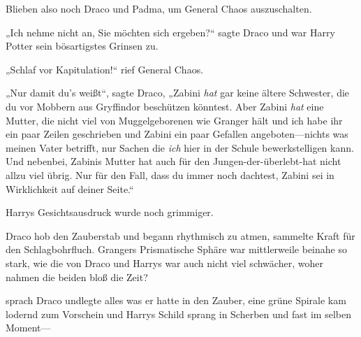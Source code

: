 Blieben also noch Draco und Padma, um General Chaos auszuschalten.

„Ich nehme nicht an, Sie möchten sich ergeben?“ sagte Draco und war Harry Potter sein bösartigstes Grinsen zu.

„Schlaf vor Kapitulation!“ rief General Chaos.

„Nur damit du’s weißt“, sagte Draco, „Zabini \emph{hat} gar keine ältere Schwester, die du vor Mobbern aus Gryffindor beschützen könntest. Aber Zabini \emph{hat} eine Mutter, die nicht viel von Muggelgeborenen wie Granger hält und ich habe ihr ein paar Zeilen geschrieben und Zabini ein paar Gefallen angeboten—nichts was meinen Vater betrifft, nur Sachen die \emph{ich} hier in der Schule bewerkstelligen kann. Und nebenbei, Zabinis Mutter hat auch für den Jungen-der-überlebt-hat nicht allzu viel übrig. Nur für den Fall, dass du immer noch dachtest, Zabini sei in Wirklichkeit auf deiner Seite.“

Harrys Gesichtsausdruck wurde noch grimmiger.

Draco hob den Zauberstab und begann rhythmisch zu atmen, sammelte Kraft für den Schlagbohrfluch. Grangers Prismatische Sphäre war mittlerweile beinahe so stark, wie die von Draco und Harrys war auch nicht viel schwächer, woher nahmen die beiden bloß die Zeit?

 sprach Draco undlegte alles was er hatte in den Zauber, eine grüne Spirale kam lodernd zum Vorschein und Harrys Schild sprang in Scherben und fast im selben Moment—

